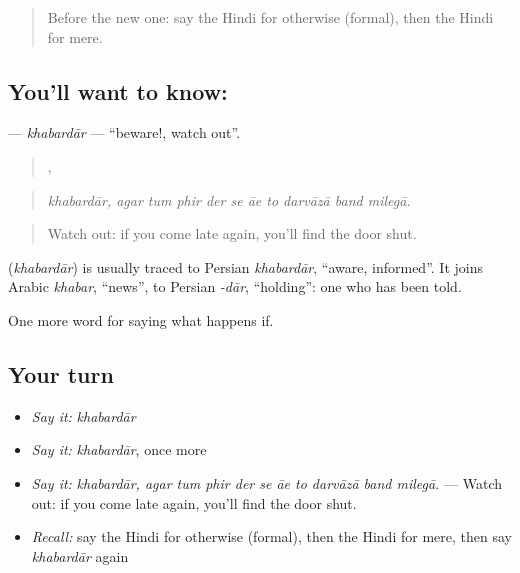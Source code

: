 \label{lesson:HI-C379-khabardar}



\begin{quote}
Before the new one: say the Hindi for otherwise (formal), then the Hindi for mere.
\end{quote}

\subsection*{You'll want to know: }
\textbf{} — \emph{khabardār} — \textquotedblleft{}beware!, watch out\textquotedblright{}.

\begin{quote}
,          
\end{quote}

\begin{quote}
\emph{khabardār, agar tum phir der se āe to darvāzā band milegā.}
\end{quote}

\begin{quote}
Watch out: if you come late again, you'll find the door shut.
\end{quote}

\begin{cousinweb}
\textbf{} (\emph{khabardār}) is usually traced to Persian \emph{khabardār}, \textquotedblleft{}aware, informed\textquotedblright{}. It joins Arabic \emph{khabar}, \textquotedblleft{}news\textquotedblright{}, to Persian \emph{-dār}, \textquotedblleft{}holding\textquotedblright{}: one who has been told.
\end{cousinweb}

\begin{grammarlens}[title={What you've built}]
One more word for saying what happens if.
\end{grammarlens}

\subsection*{Your turn}
\begin{itemize}
\raggedright
  \item \emph{Say it:} \emph{khabardār}
  \item \emph{Say it:} \emph{khabardār}, once more
  \item \emph{Say it:} \emph{khabardār, agar tum phir der se āe to darvāzā band milegā.} — Watch out: if you come late again, you'll find the door shut.
  \item \emph{Recall:} say the Hindi for otherwise (formal), then the Hindi for mere, then say \emph{khabardār} again
\end{itemize}

